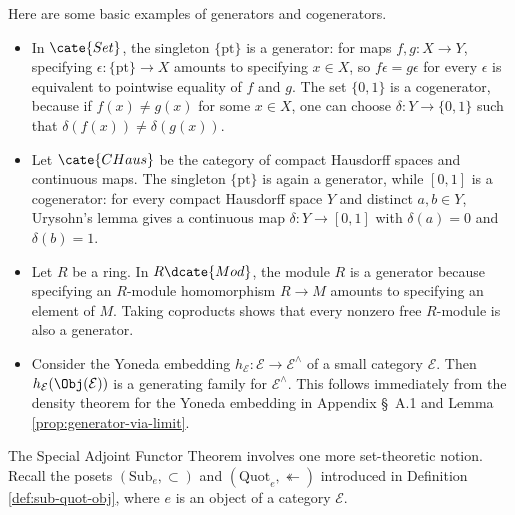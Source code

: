 \begin{example}\label{eg:generators}
	Here are some basic examples of generators and cogenerators.
	\begin{itemize}
		\item In $\cate{Set}$, the singleton $\{\mathrm{pt}\}$ is a generator:
		for maps $f,g:X\to Y$, specifying $\epsilon:\{\mathrm{pt}\}\to X$
		amounts to specifying $x\in X$, so $f\epsilon=g\epsilon$ for every
		$\epsilon$ is equivalent to pointwise equality of $f$ and $g$. The set
		$\{0,1\}$ is a cogenerator, because if $f(x)\ne g(x)$ for some $x\in X$,
		one can choose $\delta:Y\to\{0,1\}$ such that
		$\delta(f(x))\ne\delta(g(x))$.

		\item Let $\cate{CHaus}$ be the category of compact Hausdorff spaces and
		continuous maps. The singleton $\{\mathrm{pt}\}$ is again a generator,
		while $[0,1]$ is a cogenerator: for every compact Hausdorff space $Y$ and
		distinct $a,b\in Y$, Urysohn's lemma
		\cite[Theorem 6.3.1 and Corollary 7.2.6]{Xiong} gives a continuous map
		$\delta:Y\to[0,1]$ with $\delta(a)=0$ and $\delta(b)=1$.

		\item Let $R$ be a ring. In $R\dcate{Mod}$, the module $R$ is a
		generator because specifying an $R$-module homomorphism $R\to M$ amounts
		to specifying an element of $M$. Taking coproducts shows that every
		nonzero free $R$-module is also a generator.

		\item Consider the Yoneda embedding
		$h_{\mathcal{E}}:\mathcal{E}\to\mathcal{E}^\wedge$ of a small category
		$\mathcal{E}$. Then $h_{\mathcal{E}}(\Obj(\mathcal{E}))$ is a
		generating family for $\mathcal{E}^\wedge$. This follows immediately
		from the density theorem for the Yoneda embedding in Appendix \S~A.1 and
		Lemma \ref{prop:generator-via-limit}.
	\end{itemize}
\end{example}

The Special Adjoint Functor Theorem involves one more set-theoretic notion.
Recall the posets $(\mathrm{Sub}_e,\subset)$ and
$(\mathrm{Quot}_e,\twoheadleftarrow)$ introduced in Definition
\ref{def:sub-quot-obj}, where $e$ is an object of a category $\mathcal{E}$.


